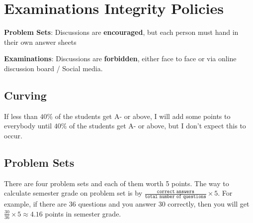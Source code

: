 \documentclass[12pt]{article}
\begin{document}

\section*{Examinations Integrity Policies}

\textbf{Problem Sets}: Discussions are \textbf{encouraged}, but each person must hand in their own answer sheets

\textbf{Examinations}: Discussions are \textbf{forbidden}, either face to face or via online discussion board / Social media.



\subsection*{Curving}

If less than $40\%$ of the students get A- or above, I will add some points to everybody until $40\%$ of the students get A- or above, but I don't expect this to occur.

\subsection*{Problem Sets}
\label{sub:Problem_Sets}

There are four problem sets and each of them worth 5 points.
The way to calculate semester grade on problem set is by $ \frac{ \texttt{correct answers} }{ \texttt{total number of questions} } \times 5 $.
For example, if there are 36 questions and you answer 30 correctly, then you will get $ \frac{30}{36} \times 5 \approx 4.16$ points in semester grade.
\end{document}
